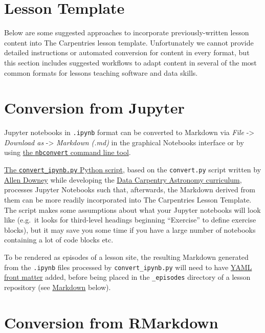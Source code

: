 \documentclass[
]{book}
\begin{document}
\hypertarget{lesson-template}{%
\section{Lesson Template}\label{lesson-template}}

Below are some suggested approaches to incorporate previously-written
lesson content into The Carpentries lesson template.
Unfortunately we cannot provide detailed instructions or automated conversion
for content in every format,
but this section includes suggested workflows to adapt content in several
of the most common formats for lessons teaching software and data skills.

\hypertarget{conversion-from-jupyter}{%
\section{Conversion from Jupyter}\label{conversion-from-jupyter}}

Jupyter notebooks in \texttt{.ipynb} format can be converted to Markdown via
\emph{File} -\textgreater{} \emph{Download as} -\textgreater{} \emph{Markdown (.md)} in the graphical Notebooks interface
or by using \href{https://nbconvert.readthedocs.io/en/latest/}{the \texttt{nbconvert} command line tool}.

\href{utils/convert_ipynb.py}{The \texttt{convert\_ipynb.py} Python script},
based on the \texttt{convert.py} script written by \href{https://www.allendowney.com/wp/}{Allen Downey} while developing the
\href{https://datacarpentry.github.io/astronomy-python}{Data Carpentry Astronomy curriculum},
processes Jupyter Notebooks such that, afterwards,
the Markdown derived from them
can be more readily incorporated into The Carpentries Lesson Template.
The script makes some assumptions about what your Jupyter notebooks will look like
(e.g.~it looks for third-level headings beginning ``Exercise'' to define exercise blocks),
but it may save you some time if you have a large number of notebooks containing
a lot of code blocks etc.

To be rendered as episodes of a lesson site,
the resulting Markdown generated from the \texttt{.ipynb} files processed by \texttt{convert\_ipynb.py}
will need to have \protect\hyperlink{add-yaml-front-matter}{YAML front matter} added, before being placed in the \texttt{\_episodes} directory of a lesson repository (see \protect\hyperlink{markdown}{Markdown} below).

\hypertarget{conversion-from-rmarkdown}{%
\section{Conversion from RMarkdown}\label{conversion-from-rmarkdown}}
\end{document}
